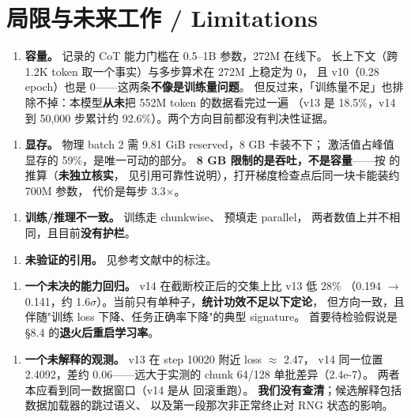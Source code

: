 \documentclass[11pt,openany]{ctexart}
\begin{document}
\reportrule

\section{局限与未来工作 / Limitations}

\begin{enumerate}
  \item \textbf{容量。}  记录的 CoT 能力门槛在 0.5–1B 参数，272M 在线下。 长上下文（跨 1.2K token 取一个事实）与多步算术在 272M 上稳定为 0， 且 v10（0.28 epoch）也是 0——这两条\textbf{不像是训练量问题}。 但反过来，「训练量不足」也排除不掉：本模型\textbf{从未}把 552M token 的数据看完过一遍 （v13 是 18.5\%，v14 到 50,000 步累计约 92.6\%）。两个方向目前都没有判决性证据。
\end{enumerate}
\begin{enumerate}
  \item \textbf{显存。} 物理 batch 2 需 9.81 GiB reserved，8 GB 卡装不下； 激活值占峰值显存的 59\%，是唯一可动的部分。 \textbf{8 GB 限制的是吞吐，不是容量}——按  的推算（\textbf{未独立核实}， 见引用可靠性说明），打开梯度检查点后同一块卡能装约 700M 参数， 代价是每步 3.3$\times$。
\end{enumerate}
\begin{enumerate}
  \item \textbf{训练/推理不一致。} 训练走 chunkwise、 预填走 parallel， 两者数值上并不相同，且目前\textbf{没有护栏}。
\end{enumerate}
\begin{enumerate}
  \item \textbf{未验证的引用。} 见参考文献中的标注。
\end{enumerate}
\begin{enumerate}
  \item \textbf{一个未决的能力回归。} v14 在截断校正后的交集上比 v13 低 28\% （0.194 $\rightarrow$ 0.141，约 1.6$\sigma$）。当前只有单种子，\textbf{统计功效不足以下定论}， 但方向一致，且伴随"训练 loss 下降、任务正确率下降"的典型 signature。 首要待检验假说是 §8.4 的\textbf{退火后重启学习率}。
\end{enumerate}
\begin{enumerate}
  \item \textbf{一个未解释的观测。} v13 在 step 10020 附近 loss $\approx$ 2.47， v14 同一位置 2.4092，差约 0.06——远大于实测的 chunk 64/128 单批差异（2.4e-7）。 两者本应看到同一数据窗口（v14 是从  回滚重跑）。 \textbf{我们没有查清}；候选解释包括数据加载器的跳过语义、 以及第一段那次非正常终止对 RNG 状态的影响。
\end{enumerate}
\end{document}

